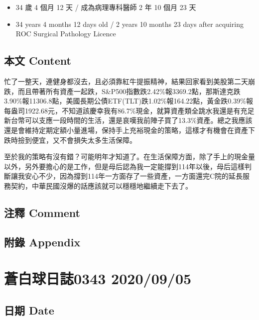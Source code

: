 \documentclass[a5paper, 11pt
]{book}
\providecommand{\tightlist}{%
  \setlength{\itemsep}{0pt}\setlength{\parskip}{0pt}}
\begin{document}
\begin{itemize}
\tightlist
\item
  34 歲 4 個月 12 天 / 成為病理專科醫師 2 年 10 個月 23 天
\item
  34 years 4 months 12 days old / 2 years 10 months 23 days after
  acquiring ROC Surgical Pathology Licence
\end{itemize}

\hypertarget{ux672cux6587-content-3}{%
\subsection{本文 Content}\label{ux672cux6587-content-3}}

忙了一整天，連健身都沒去，且必須靠紅牛提振精神，結果回家看到美股第二天崩跌，而且帶著所有資產一起跌，S\&P500指數跌2.42\%報3369.2點，那斯達克跌3.90\%報11306.8點，美國長期公債ETF(TLT)跌1.02\%報164.22點，黃金跌0.39\%報每盎司1922.68元，不知道該慶幸我有86.7\%現金，就算資產類全跳水我還是有充足新台幣可以支應一段時間的生活，還是哀嘆我前陣子買了13.3\%資產。總之我應該還是會維持定期定額小量進場，保持手上充裕現金的策略，這樣才有機會在資產下跌時撿到便宜，又不會損失太多生活保障。

至於我的策略有沒有錯？可能明年才知道了。在生活保障方面，除了手上的現金量以外，另外要擔心的是工作，但是母后認為我一定能撐到114年以後，母后這樣判斷讓我安心不少，因為撐到114年一方面存了一些資產，一方面還完C院的延長服務契約，中華民國沒爆的話應該就可以穩穩地繼續走下去了。

\hypertarget{ux6ce8ux91cb-comment-3}{%
\subsection{注釋 Comment}\label{ux6ce8ux91cb-comment-3}}

\hypertarget{ux9644ux9304-appendix-3}{%
\subsection{附錄 Appendix}\label{ux9644ux9304-appendix-3}}

\hypertarget{ux84bcux767dux7403ux65e5ux8a8c0343-20200905}{%
\section{蒼白球日誌0343
2020/09/05}\label{ux84bcux767dux7403ux65e5ux8a8c0343-20200905}}

\hypertarget{ux65e5ux671f-date-4}{%
\subsection{日期 Date}\label{ux65e5ux671f-date-4}}
\end{document}
